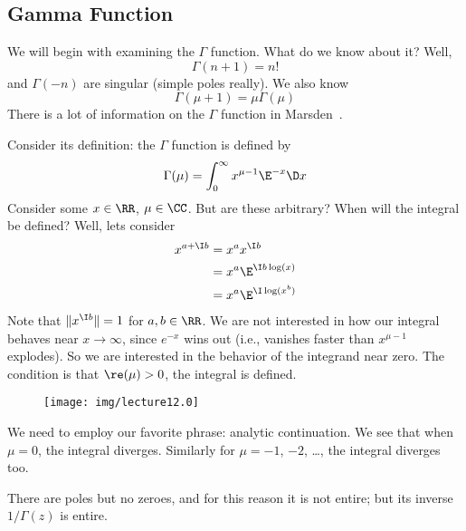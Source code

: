 \subsection{Gamma Function}
We will begin with examining the $\Gamma$ function. What do we
know about it? Well,
\begin{equation}
\Gamma(n+1)=n!
\end{equation}
and $\Gamma(-n)$ are singular (simple poles really). We also know
\begin{equation}
\Gamma(\mu+1)=\mu\Gamma(\mu)
\end{equation}
There is a lot of information on the $\Gamma$ function in
Marsden~\cite{marsden}. 

Consider its definition: the $\Gamma$ function is defined by
\begin{equation}\label{eq:lecture12:defnOfGammaFn}
\Gamma(\mu)=\int^{\infty}_{0}x^{\mu-1}\E^{-x}\D x
\end{equation}
Consider some $x\in\RR$, $\mu\in\CC$. But are these arbitrary?
When will the integral be defined? Well, lets consider
\begin{subequations}
\begin{align}
x^{a+\I b} &= x^{a}x^{\I b}\\
&=x^{a}\E^{\I b\log(x)}\\
&=x^{a}\E^{\I\log(x^{b})}
\end{align}
\end{subequations}
Note that $\|x^{\I b}\|=1$ for $a,b\in\RR$. We are not interested
in how our integral behaves near $x\to\infty$, since $e^{-x}$
wins out (i.e., vanishes faster than $x^{\mu-1}$ explodes). So we
are interested in the behavior of the integrand near zero. The
condition is that $\re(\mu)>0$, the integral is defined.

\begin{wrapfigure}{r}{2.75in}
\vspace{-30pt}
\begin{center}
\texttt{[image: img/lecture12.0]}
\end{center}
\vspace{-20pt}
\end{wrapfigure}
We need to employ our favorite phrase: analytic continuation. We
see that when $\mu=0$, the integral diverges. Similarly for
$\mu=-1$, $-2$, \dots, the integral diverges too.

There are poles but no zeroes, and for this reason it is not
entire; but its inverse $1/\Gamma(z)$ is entire.

